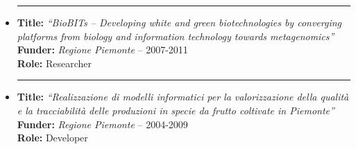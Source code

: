 \documentclass[a4paper,10pt]{article}
\newcommand{\noitem}{\item[]}
\begin{document}
\begin{itemize}[leftmargin=*,itemsep=1.2ex]
	\noitem\rule{1mm}{0pt}   \begin{minipage}[t]{0.94\textwidth}
		\textbf{Title:} \emph{``BioBITs -- Developing white and green biotechnologies by converging platforms from biology and information technology towards metagenomics''}\\
		\textbf{Funder:} \emph{Regione Piemonte} -- 2007-2011\\
		\textbf{Role:} Researcher
	\end{minipage}
	
	\noitem\rule{1mm}{0pt}  \begin{minipage}[t]{0.94\textwidth}
		\textbf{Title:} \emph{``Realizzazione di modelli informatici per la valorizzazione della qualit\`a e la tracciabilit\`a delle produzioni in specie da frutto coltivate in Piemonte''}\\
		\textbf{Funder:} \emph{Regione Piemonte} -- 2004-2009\\
		\textbf{Role:} Developer
	\end{minipage}
			
\end{itemize}

\vspace{0.4cm}

\end{document}

